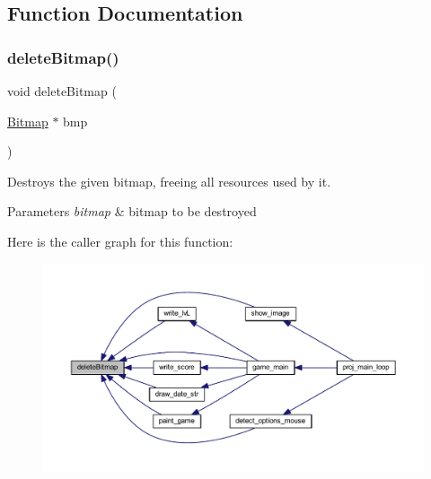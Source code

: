 \subsection{Function Documentation}
\mbox{\label{group__bitmap_ga08c1d4f4fff81df260d979ea8fc1aa61}} 
\subsubsection{\texorpdfstring{delete\+Bitmap()}{deleteBitmap()}}
{\footnotesize\ttfamily void delete\+Bitmap (\begin{DoxyParamCaption}\item[{\mbox{\hyperlink{struct_bitmap}{Bitmap}} $\ast$}]{bmp }\end{DoxyParamCaption})}



Destroys the given bitmap, freeing all resources used by it. 


\begin{DoxyParams}{Parameters}
{\em bitmap} & bitmap to be destroyed \\
\hline
\end{DoxyParams}
Here is the caller graph for this function\+:
\nopagebreak
\begin{figure}[H]
\begin{center}
\leavevmode
\includegraphics[width=350pt]{group__bitmap_ga08c1d4f4fff81df260d979ea8fc1aa61_icgraph}
\end{center}
\end{figure}
\mbox{\label{group__bitmap_ga6652acd82369d03df807a689437efc1b}} 
